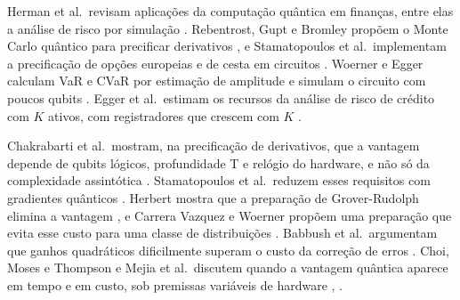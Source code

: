\documentclass[conference,a4paper]{IEEEtran}
\begin{document}
Herman et al.~revisam aplicações da computação quântica em finanças, entre elas a análise de risco por simulação \cite{herman2023finance}. Rebentrost, Gupt e Bromley propõem o Monte Carlo quântico para precificar derivativos \cite{rebentrost2018finance}, e Stamatopoulos et al.~implementam a precificação de opções europeias e de cesta em circuitos \cite{stamatopoulos2020option}. Woerner e Egger calculam VaR e CVaR por estimação de amplitude e simulam o circuito com poucos qubits \cite{woerner2019risk}. Egger et al.~estimam os recursos da análise de risco de crédito com \(K\) ativos, com registradores que crescem com \(K\) \cite{egger2021credit}.

Chakrabarti et al.~mostram, na precificação de derivativos, que a vantagem depende de qubits lógicos, profundidade T e relógio do hardware, e não só da complexidade assintótica \cite{chakrabarti2021threshold}. Stamatopoulos et al.~reduzem esses requisitos com gradientes quânticos \cite{stamatopoulos2022marketrisk}. Herbert mostra que a preparação de Grover-Rudolph elimina a vantagem \cite{herbert2021groverrudolph}, e Carrera Vazquez e Woerner propõem uma preparação que evita esse custo para uma classe de distribuições \cite{carreravazquez2021stateprep}. Babbush et al.~argumentam que ganhos quadráticos dificilmente superam o custo da correção de erros \cite{babbush2021quadratic}. Choi, Moses e Thompson e Mejia et al.~discutem quando a vantagem quântica aparece em tempo e em custo, sob premissas variáveis de hardware \cite{choi2025tortoise}, \cite{mejia2025calculator}.
\end{document}
